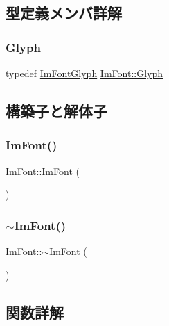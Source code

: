 \subsection{型定義メンバ詳解}
\mbox{\label{struct_im_font_a4b802233ac8d3f3beddc395837288683}} 
\subsubsection{\texorpdfstring{Glyph}{Glyph}}
{\footnotesize\ttfamily typedef \mbox{\hyperlink{struct_im_font_glyph}{Im\+Font\+Glyph}} \mbox{\hyperlink{struct_im_font_a4b802233ac8d3f3beddc395837288683}{Im\+Font\+::\+Glyph}}}



\subsection{構築子と解体子}
\mbox{\label{struct_im_font_a1d35b1eb7c2f6a3a648308531e88e7f1}} 
\subsubsection{\texorpdfstring{Im\+Font()}{ImFont()}}
{\footnotesize\ttfamily Im\+Font\+::\+Im\+Font (\begin{DoxyParamCaption}{ }\end{DoxyParamCaption})}

\mbox{\label{struct_im_font_a377366ed7c5d076363ad4760aeff63ec}} 
\subsubsection{\texorpdfstring{$\sim$\+Im\+Font()}{~ImFont()}}
{\footnotesize\ttfamily Im\+Font\+::$\sim$\+Im\+Font (\begin{DoxyParamCaption}{ }\end{DoxyParamCaption})}



\subsection{関数詳解}
\mbox{\label{struct_im_font_ae63d3d343052336d7718aacac8f394b7}} 
